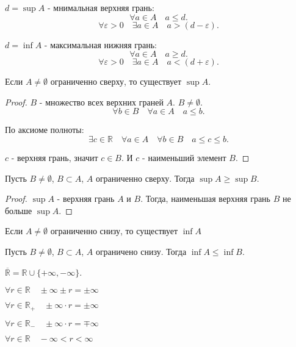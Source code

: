     
    \begin{definition}
        $d=\sup A$ - мнимальная верхняя грань:
        \[ \forall{a \in A}\quad a\le   d.\] 
        \[\forall{\varepsilon > 0}\quad \exists{a \in A}\quad a>  (d-\varepsilon) .\] 
    \end{definition}
    \begin{definition}
        $d=\inf A$ - максимальная нижняя грань:
    \[ \forall{a \in A}\quad a\ge   d.\] 
    \[\forall{\varepsilon > 0}\quad \exists{a \in A}\quad a< (d+\varepsilon) .\] 
    \end{definition}
    \begin{theorem}
        Если $A \neq \emptyset$ ограниченно сверху, то существует $\sup A$.
         \begin{proof}
            $B$ - множество всех верхних граней  $A$.  $B \neq \emptyset$.
            \[ \forall{b \in B}\quad \forall{a \in A}\quad a\le b .\]

            По аксиоме полноты:
            \[ \exists{c \in \mathbb{R}}\quad \forall{a \in A}\quad \forall{b \in B}\quad a\le c\le b .\]

            $c$ - верхняя грань, значит  $c \in B$. И $c$ - наименьший элемент  $B$.
        \end{proof}
        
    \end{theorem}
    \begin{lemma}
        Пусть $B \neq \emptyset$, $B \subset A$, $A$ ограниченно сверху. Тогда  $\sup A \ge \sup B$.
        \begin{proof}
            $\sup A$ - верхняя грань  $A$ и $B$. Тогда, наименьшая верхняя грань  $B$ не больше  $\sup A$.
        \end{proof}
    \end{lemma}
    \begin{theorem} Если $A \neq \emptyset$ ограниченно снизу, то существует $\inf A$ \end{theorem}
    \begin{lemma} Пусть $B \neq \emptyset$, $B \subset A$, $A$ ограничено снизу. Тогда $\inf A \le \inf B$. \end{lemma}
    \begin{definition} 
        $\overline{\mathbb{R}} = \mathbb{R} \cup \{+\infty, -\infty\} $.
        
        $\forall{r\in \mathbb{R}}\quad \pm \infty \pm r = \pm \infty$
        
        $\forall{r\in \mathbb{R}_{+}}\quad \pm \infty \cdot r = \pm \infty$

        $\forall{r\in \mathbb{R}_{-}}\quad \pm \infty \cdot r = \mp \infty$

        $\forall{r\in \mathbb{R}}\quad -\infty < r < \infty$
    \end{definition}
